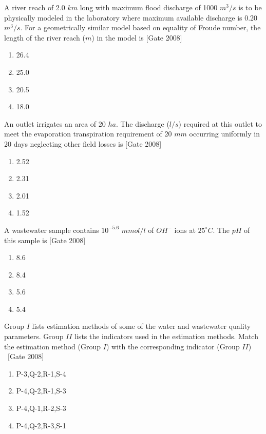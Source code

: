 	\item A river reach of 2.0 $km$ long with maximum flood discharge of 1000 $m^3/s$ is to be physically modeled in the laboratory where maximum available discharge is 0.20 $m^3/s$. For 
a geometrically similar model based on equality of Froude number, the length of the river reach ($m$) in the model is  \hfill [Gate 2008]
\begin{multicols}{4}
	\begin{enumerate}
		\item 26.4
		\item 25.0
		\item 20.5
		\item 18.0
	\end{enumerate}
\end{multicols}
	\item An outlet irrigates an area of $20$ $ha$. The discharge ($l/s$) required at this outlet to meet the evaporation transpiration requirement of 20 $mm$ occurring uniformly in 20 days neglecting other field losses is  \hfill [Gate 2008]
		\begin{multicols}{4}
	\begin{enumerate}
		\item 2.52
		\item 2.31
		\item 2.01
		\item 1.52
	\end{enumerate}
\end{multicols}
	\item A wastewater sample contains $10^{-5.6}$ $mmol/l$ of $OH^{-}$ ions at $25 ^{\circ}C$. The $pH$ of this sample is
		 \hfill [Gate 2008]
		\begin{multicols}{4}
	\begin{enumerate}
		\item 8.6
		\item 8.4
		\item 5.6
		\item 5.4
	\end{enumerate}
\end{multicols}
	\item Group $I$ lists estimation methods of some of the water and wastewater quality parameters. Group $II$ lists the indicators used in the estimation methods. Match the estimation method (Group $I$) with the corresponding indicator (Group $II$) \ \hfill [Gate 2008]
		
	\begin{multicols}{2}
	\begin{enumerate}
		\item P-3,Q-2,R-1,S-4
		\item P-4,Q-2,R-1,S-3
		\item P-4,Q-1,R-2,S-3
		\item P-4,Q-2,R-3,S-1
	\end{enumerate}
\end{multicols}
